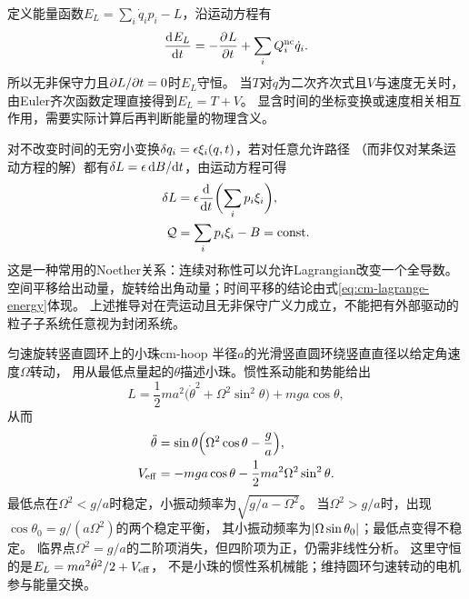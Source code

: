 定义能量函数$\textstyle E_L = \sum_i\dot q_ip_i - L$，沿运动方程有
\begin{equation}
 \frac{\mathop{}\!\mathrm{d}^{}E_L}{\mathrm{d}{t}^{}} = -\frac{\partial^{}L}{\partial{t}^{}} + \sum_iQ_i^{\mathrm{nc}}\dot q_i.
 \label{eq:cm-lagrange-energy}
\end{equation}
所以无非保守力且$\partial L/\partial t = 0$时$E_L$守恒。
当$T$对$\dot q$为二次齐次式且$V$与速度无关时，由Euler齐次函数定理直接得到$E_L = T + V$。
显含时间的坐标变换或速度相关相互作用，需要实际计算后再判断能量的物理含义。

对不改变时间的无穷小变换$\mathop{}\!\delta q_i = \epsilon\xi_i(q,t)$，若对任意允许路径
（而非仅对某条运动方程的解）都有$\mathop{}\!\delta L = \epsilon\mathop{}\!\mathrm{d} B/\mathrm{d} t$，由运动方程可得
\begin{subequations}
 \begin{align}
  \mathop{}\!\delta L &= \epsilon\frac{\mathop{}\!\mathrm{d}^{}}{\mathrm{d}{t}^{}}\biggl(\sum_i p_i\xi_i\biggr),\\
  \mathcal Q &= \sum_i p_i\xi_i - B = \mathrm{const}.
 \end{align}
\end{subequations}
这是一种常用的Noether关系：连续对称性可以允许Lagrangian改变一个全导数。
空间平移给出动量，旋转给出角动量；时间平移的结论由式\eqref{eq:cm-lagrange-energy}体现。
上述推导对在壳运动且无非保守广义力成立，不能把有外部驱动的粒子子系统任意视为封闭系统。

\begin{example}{匀速旋转竖直圆环上的小珠}{cm-hoop}
半径$a$的光滑竖直圆环绕竖直直径以给定角速度$\Omega$转动，
用从最低点量起的$\theta$描述小珠。惯性系动能和势能给出
\begin{equation}
 L = \frac12ma^2\bigl(\dot\theta^2 + \Omega^2\sin^2\theta\bigr) + mga\cos\theta,
\end{equation}
从而
\begin{subequations}
 \begin{align}
  \ddot\theta &= \sin\theta\Bigl(\Omega^2\cos\theta - \frac ga\Bigr),\\
  V_{\mathrm{eff}} &= -mga\cos\theta - \frac12ma^2\Omega^2\sin^2\theta.
 \end{align}
\end{subequations}
最低点在$\Omega^2 < g/a$时稳定，小振动频率为$\sqrt{g/a - \Omega^2}$。
当$\Omega^2 > g/a$时，出现$\cos\theta_0 = g/(a\Omega^2)$的两个稳定平衡，
其小振动频率为$\lvert\Omega\sin\theta_0\rvert$；最低点变得不稳定。
临界点$\Omega^2 = g/a$的二阶项消失，但四阶项为正，仍需非线性分析。
这里守恒的是$E_L = ma^2\dot\theta^2/2 + V_{\mathrm{eff}}$，
不是小珠的惯性系机械能；维持圆环匀速转动的电机参与能量交换。
\end{example}

